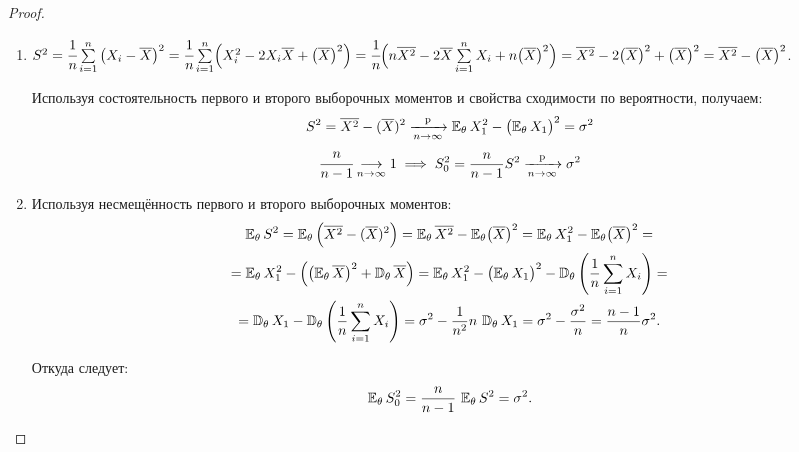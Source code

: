 \begin{proof}
\begin{enumerate}
    \item 
    $S^{2} = 
    \cfrac{1}{n} \sum\limits_{i=1}^{n}\left(X_{i}-\overline{X}\right)^{2} = 
    \cfrac{1}{n} \sum\limits_{i=1}^{n}\Bigl(X_i^2 - 2 X_i \overline{X} + \bigl(\overline{X}\bigr)^2 \Bigr) = \\
    \cfrac{1}{n} \Bigl( n \overline{X^2} - 2 \overline{X} \sum\limits_{i=1}^{n}X_i + n \bigl(\overline{X}\bigr)^2\Bigr) = 
    \overline{X^{2}}-2\bigl(\overline{X}\bigr)^{2} + \bigl(\overline{X}\bigr)^2 = 
    \overline{X^{2}}-\bigl(\overline{X}\bigr)^{2}$.

    Используя состоятельность первого и второго выборочных моментов и свойства сходимости по вероятности, получаем:
    \begin{gather*}
        S^{2}=\overline{X^{2}}-(\overline{X})^{2} \xrightarrow[n \to \infty]{\text{p}} \operatorname{\operatorname{\mathbb{E}}_{\theta}}  X_{1}^{2} - \bigl(\operatorname{\operatorname{\mathbb{E}}_{\theta}}  X_{1}\bigr)^{2}=\sigma^{2} \\
        \cfrac{n}{n-1} \underset{n \to \infty}{\longrightarrow} 1 \implies S_{0}^{2}=\frac{n}{n-1} S^{2} \xrightarrow[n \to \infty]{\text{p}} \sigma^{2}
    \end{gather*}
    
    \item Используя несмещённость первого и второго выборочных моментов:
    \begin{multline*}
        \operatorname{\operatorname{\mathbb{E}}_{\theta}}  S^{2} = \operatorname{\operatorname{\mathbb{E}}_{\theta}} \left(\overline{X^{2}}-(\overline{X})^{2}\right)
        = \operatorname{\operatorname{\mathbb{E}}_{\theta}} \overline{X^{2}}-\operatorname{\operatorname{\mathbb{E}}_{\theta}} \bigl(\overline{X}\bigr)^{2}
        = \operatorname{\operatorname{\mathbb{E}}_{\theta}} X_{1}^{2}-\operatorname{\operatorname{\mathbb{E}}_{\theta}} \bigl(\overline{X}\bigr)^{2} = \\
        = \operatorname{\operatorname{\mathbb{E}}_{\theta}} X_{1}^{2}-\Bigl(\bigl(\operatorname{\operatorname{\mathbb{E}}_{\theta}} \overline{X}\bigr)^{2} + \operatorname{\mathbb{D}_{\theta}} \overline{X}\Bigr)
        = \operatorname{\operatorname{\mathbb{E}}_{\theta}} X_{1}^{2}-\bigl(\operatorname{\operatorname{\mathbb{E}}_{\theta}} X_{1}\bigr)^{2} - \operatorname{\mathbb{D}_{\theta}} \left(\frac{1}{n} \sum\limits_{i=1}^{n} X_{i}\right) = \\
        = \operatorname{\mathbb{D}_{\theta}} X_1 - \operatorname{\mathbb{D}_{\theta}} \left(\frac{1}{n} \sum\limits_{i=1}^{n} X_{i}\right)
        = \sigma^{2}-\frac{1}{n^{2}} n \, \operatorname{\mathbb{D}_{\theta}}  X_{1}
        = \sigma^{2}-\frac{\sigma^{2}}{n}
        = \frac{n-1}{n} \sigma^{2}.
    \end{multline*}
    
    Откуда следует:
    \begin{equation*}
        \operatorname{\operatorname{\mathbb{E}}_{\theta}} S_{0}^{2}=\frac{n}{n-1} \, \operatorname{\operatorname{\mathbb{E}}_{\theta}} S^{2}=\sigma^{2}.
    \end{equation*}
    

\end{enumerate}
\end{proof}
